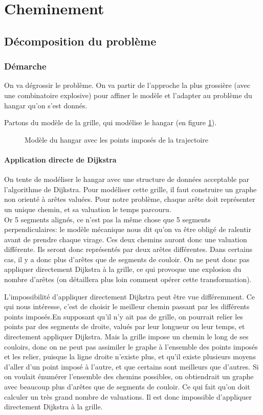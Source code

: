 \section{Cheminement}
\label{combinaison}
\subsection{Décomposition du problème}
\subsubsection{Démarche}
On va dégrossir le problème. On va partir de l'approche la plus grossière (avec une combinatoire explosive) pour affiner le modèle et l'adapter au problème du hangar qu'on s'est donnés.

Partons du modèle de la grille, qui modélise le hangar (en figure \ref{fig:grille1}).
\begin{figure}[h]
	\centering
	
	\caption{Modèle du hangar avec les points imposés de la trajectoire}
	\label{fig:grille1}
\end{figure}
\paragraph{Application directe de Dijkstra} On tente de modéliser le hangar avec une structure de données acceptable par l'algorithme de Dijkstra. \cite{dijkstra} \cite{wiki:dijkstra} Pour modéliser cette grille, il faut construire un graphe non orienté à arêtes valuées. Pour notre problème, chaque arête doit représenter un unique chemin, et sa valuation le temps parcouru.\\
Or 5 segments alignés, ce n'est pas la même chose que 5 segments perpendiculaires: le modèle mécanique nous dit qu'on va être obligé de ralentir avant de prendre chaque virage. Ces deux chemins auront donc une valuation différente. Ils seront donc représentés par deux arêtes différentes. Dans certains cas, il y a donc plus d'arêtes que de segments de couloir. On ne peut donc pas appliquer directement Dijkstra à la grille, ce qui provoque une explosion du nombre d'arêtes (on détaillera plus loin comment opérer cette transformation).

L'impossibilité d'appliquer directement Dijkstra peut être vue différemment. Ce qui nous intéresse, c'est de choisir le meilleur chemin passant par les différents points imposés.En supposant qu'il n'y ait pas de grille, on pourrait relier les points par des segments de droite, valués par leur longueur ou leur temps, et directement appliquer Dijkstra. Mais la grille impose un chemin le long de ses couloirs, donc on ne peut pas assimiler le graphe à l'ensemble des points imposés et les relier, puisque la ligne droite n'existe plus, et qu'il existe plusieurs moyens d'aller d'un point imposé à l'autre, et que certains sont meilleurs que d'autres. Si on voulait énumérer l'ensemble des chemins possibles, on obtiendrait un graphe avec beaucoup plus d'arêtes que de segments de couloir. Ce qui fait qu'on doit calculer un très grand nombre de valuations. Il est donc impossible d'appliquer directement Dijkstra à la grille.

